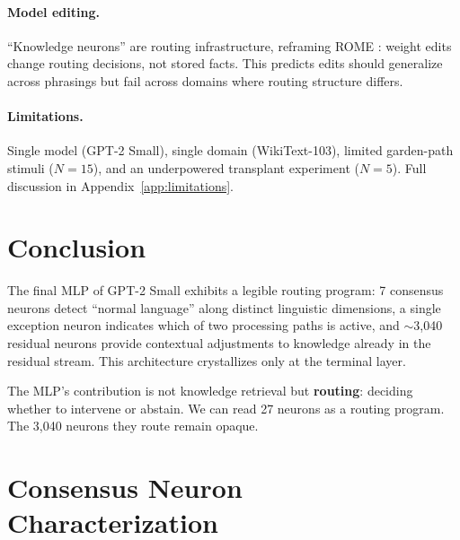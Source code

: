 \documentclass{article}
\begin{document}
\paragraph{Model editing.}
``Knowledge neurons'' are routing infrastructure, reframing ROME
\citep{meng2022locating}: weight edits change routing decisions, not stored
facts. This predicts edits should generalize across phrasings but fail across
domains where routing structure differs.

\paragraph{Limitations.}
Single model (GPT-2 Small), single domain (WikiText-103), limited garden-path
stimuli ($N = 15$), and an underpowered transplant experiment ($N = 5$).
Full discussion in Appendix~\ref{app:limitations}.

\section{Conclusion}

The final MLP of GPT-2 Small exhibits a legible routing program:
7 consensus neurons detect ``normal language'' along distinct linguistic
dimensions, a single exception neuron indicates which of two processing paths
is active, and $\sim$3{,}040 residual neurons provide contextual adjustments
to knowledge already in the residual stream.
This architecture crystallizes only at the terminal layer.

The MLP's contribution is not knowledge retrieval but \textbf{routing}:
deciding whether to intervene or abstain.
We can read 27 neurons as a routing program.
The 3{,}040 neurons they route remain opaque.




\newpage
\appendix

\section{Consensus Neuron Characterization}
\label{app:consensus}
\end{document}
